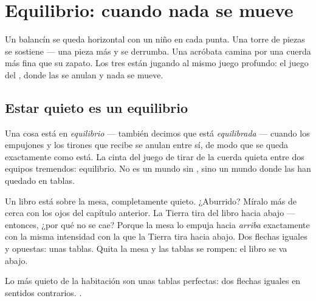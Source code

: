 \chapter{Equilibrio: cuando nada se mueve}\label{ch:g2:balance-equilibrium}

Un balancín se queda horizontal con un niño en cada punta. Una torre
de piezas se sostiene --- una pieza más y se derrumba. Una acróbata
camina por una cuerda más fina que su zapato. Los tres están jugando
al mismo juego profundo: el juego del , donde las  se
anulan y nada se mueve.

\section{Estar quieto es un equilibrio}

\begin{definition}[El equilibrio]\label{def:g2:balance-equilibrium:equilibrium}
Una cosa está en \emph{equilibrio} --- también
decimos que está \emph{equilibrada} --- cuando los
empujones y los tirones que recibe se anulan entre sí, de modo que se
queda exactamente como está. La cinta del juego de tirar de la cuerda
quieta entre dos equipos tremendos: equilibrio. No es un mundo sin
, sino un mundo donde las  han quedado en tablas.
\end{definition}

\begin{example}\label{ex:g2:balance-equilibrium:book}
Un libro está sobre la mesa, completamente quieto. ¿Aburrido? Míralo
más de cerca con los ojos del capítulo anterior. La Tierra tira del
libro hacia abajo --- entonces, ¿por qué no se cae? Porque la mesa lo
empuja hacia \emph{arriba} exactamente con la misma intensidad con la
que la Tierra tira hacia abajo. Dos flechas iguales y opuestas: unas
tablas. Quita la mesa y las tablas se rompen: el libro se va abajo.
\end{example}

\begin{omfigure}

{\small Lo más quieto de la habitación son unas tablas perfectas: dos
flechas iguales en sentidos contrarios. .}
\end{omfigure}

